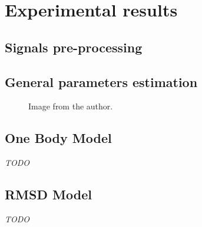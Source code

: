 \documentclass[/home/francois/latex/report/main.tex]{subfiles}
\begin{document}
\chapter{Experimental results}
\label{chapter:results}

\section{Signals pre-processing}
\label{section:pre-processing}


\section{General parameters estimation}
\label{section:results-general-parameters}


\begin{figure}[H]
  \centering
  \caption{ Image from the author.}
  \label{fig:results:torque_}
\end{figure}

\section{One Body Model}

\textit{TODO}

\section{RMSD Model}

\textit{TODO}
\end{document}
